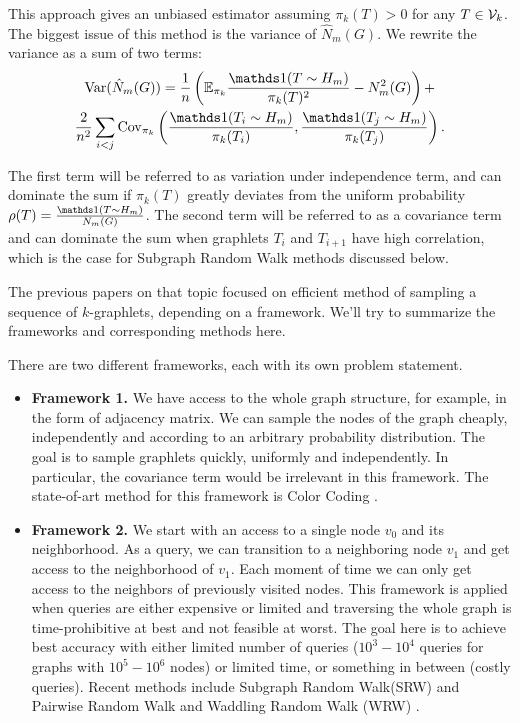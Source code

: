     This approach gives an unbiased estimator assuming $\pi_k(T) >0$ for any $T\in \mathcal{V}_k$.
    The biggest issue of this method is the variance of $\hat N_m(G)$. We rewrite the variance as a sum of two terms:
	\begin{multline}
	\label{eq:variation}
		\Var(\hat N_m(G)) = \frac{1}{n}\left( \E_{\pi_k} \frac{\ind(T\sim H_m)}{\pi_k(T)^2} - N_m^2(G)\right) +\\
		\frac{2}{n^2} \sum_{i < j} \Cov_{\pi_k}\left( \frac{\ind(T_i\sim H_m)}{\pi_k(T_i)}, \frac{\ind(T_j\sim H_m)}{\pi_k(T_j)}\right).
	\end{multline}
	
	The first term will be referred to as variation under independence term, and can dominate the sum if $\pi_k(T)$ greatly deviates from the uniform probability $\rho(T) = \frac{\ind(T\sim H_m)}{N_m(G)}$.
	The second term will be referred to as a covariance term and can dominate the sum when graphlets $T_i$ and $T_{i+1}$ have high correlation, which is the case for Subgraph Random Walk methods discussed below.
	
	The previous papers on that topic focused on efficient method of sampling a sequence of $k$-graphlets, depending on a framework.
	We'll try to summarize the frameworks and corresponding methods here.
	
	There are two different frameworks, each with its own problem statement.
	\begin{itemize}
		\item \textbf{Framework 1.} We have access to the whole graph structure, for example, in the form of adjacency matrix. 
		We can sample the nodes of the graph cheaply, independently and according to an arbitrary probability distribution.
		The goal is to sample graphlets quickly, uniformly and independently.
		In particular, the covariance term would be irrelevant in this framework.
		The state-of-art method for this framework is Color Coding \cite{Bressan2017colourcoding}.

		\item \textbf{Framework 2.} We start with an access to a single node $v_0$ and its 
		neighborhood. As a query, we can transition to a neighboring node $v_1$ and get access to the neighborhood of $v_1$.
		Each moment of time we can only get access to the neighbors of previously visited nodes. 
		This framework is applied when queries are either expensive or limited and traversing the whole graph is time-prohibitive at best and not feasible at worst. 
		The goal here is to achieve best accuracy with either limited number of queries ($10^3-10^4$ queries for graphs with $10^5-10^6$ nodes) or limited time, or something in between (costly queries).
		Recent methods include Subgraph Random Walk(SRW) and Pairwise Random Walk \cite{Wang2014psrw} and Waddling Random Walk (WRW) \cite{Han2016waddling}.
	\end{itemize}
	
